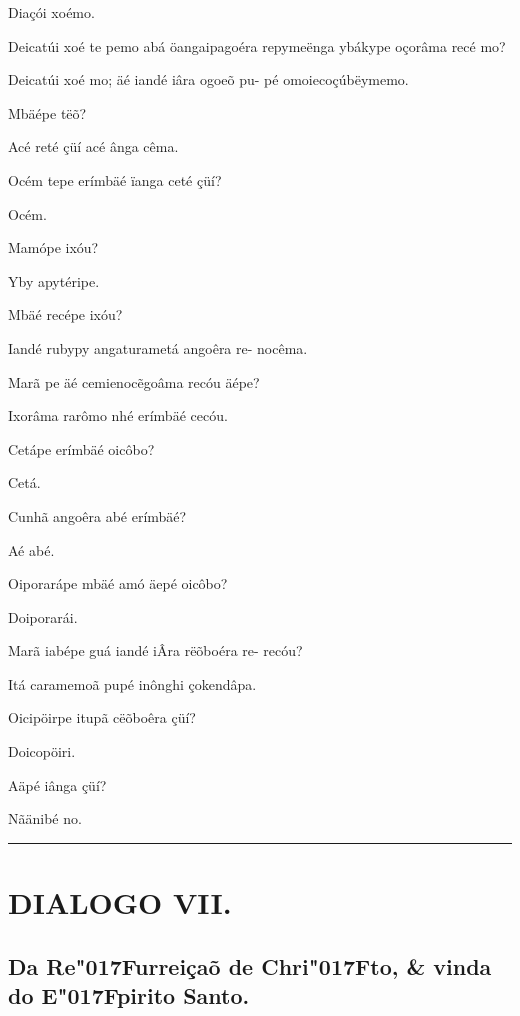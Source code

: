 \documentclass[openany,titlepage,12pt]{book}
\newcommand{\lgS}{\char"017F}
\begin{document}
\begin{altereven}
    \item Diaçói xoémo.
    \item Deicatúi xoé te pemo abá öangaipagoéra
    repymeënga ybákype oçorâma recé mo?
    \item Deicatúi xoé mo; äé iandé iâra ogoeõ pu-
    pé omoiecoçúbëymemo.
    \item Mbäépe tëõ?
    \item Acé reté çüí acé ânga cêma.
    \item Océm tepe erímbäé ïanga ceté çüí?
    \item Océm.
    \item Mamópe ixóu?
    \item Yby apytéripe.
    \item Mbäé recépe ixóu?
    \item Iandé rubypy angaturametá angoêra re-
    nocêma.
    \item Marã pe äé cemienoc\~egoâma recóu äépe?
    \item Ixorâma rarômo nhé erímbäé cecóu.
    \item Cetápe erímbäé oicôbo?
    \item Cetá.
    \item Cunhã angoêra abé erímbäé?
    \item Aé abé.
    \item Oiporarápe mbäé amó äepé oicôbo?
    \item Doiporarái.
    \item Marã iabépe guá iandé iÂra rëõboéra re-
    recóu?
    \item Itá caramemoã pupé inônghi çokendâpa.
    \item Oicipöirpe itupã cëõboêra çüí?
    \item Doicopöiri.
    \item Aäpé iânga çüí?
    \item Nãänibé no.
\end{altereven}

\newpage

\vspace{2pt}
\par\noindent\rule{\textwidth}{0.4pt}
\unskip\vspace*{2pt}
\section{DIALOGO VII.}
\subsection{Da Re\lgS urreiçaõ de Chri\lgS to, \& vinda\\
do E\lgS pirito Santo.}
\end{document}
